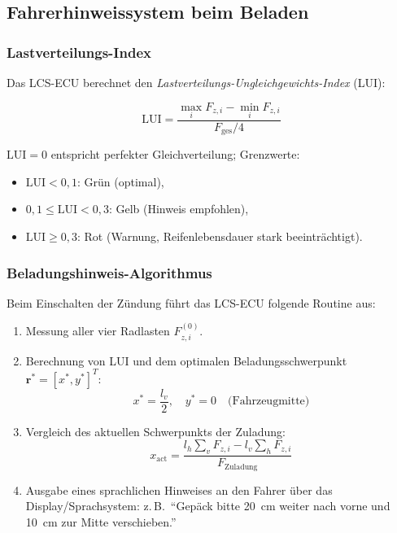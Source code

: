 ﻿\documentclass[12pt,a4paper]{article}
\theoremstyle{definition}
\theoremstyle{remark}
\begin{document}
\subsection{Fahrerhinweissystem beim Beladen}

\subsubsection{Lastverteilungs-Index}

Das LCS-ECU berechnet den \emph{Lastverteilungs-Ungleichgewichts-Index} (LUI):

\begin{equation}
  \mathrm{LUI} = \frac{\max_i F_{z,i} - \min_i F_{z,i}}{F_{\mathrm{ges}} / 4}
  \label{eq:lui}
\end{equation}

$\mathrm{LUI} = 0$ entspricht perfekter Gleichverteilung; Grenzwerte:
\begin{itemize}[nosep]
  \item $\mathrm{LUI} < 0{,}1$: Grün (optimal),
  \item $0{,}1 \leq \mathrm{LUI} < 0{,}3$: Gelb (Hinweis empfohlen),
  \item $\mathrm{LUI} \geq 0{,}3$: Rot (Warnung, Reifenlebensdauer stark beeinträchtigt).
\end{itemize}

\subsubsection{Beladungshinweis-Algorithmus}

Beim Einschalten der Zündung führt das LCS-ECU folgende Routine aus:

\begin{enumerate}
  \item Messung aller vier Radlasten $F_{z,i}^{(0)}$.
  \item Berechnung von LUI und dem optimalen Beladungsschwerpunkt
        $\mathbf{r}^* = [x^*, y^*]^T$:
        \begin{equation}
          x^* = \frac{l_v}{2}, \quad
          y^* = 0
          \quad \text{(Fahrzeugmitte)}
          \label{eq:optimal_load_center}
        \end{equation}
  \item Vergleich des aktuellen Schwerpunkts der Zuladung:
        \begin{equation}
          x_{\mathrm{act}} = \frac{l_h \sum_v F_{z,i} - l_v \sum_h F_{z,i}}{F_{\mathrm{Zuladung}}}
          \label{eq:actual_cog}
        \end{equation}
  \item Ausgabe eines sprachlichen Hinweises an den Fahrer über das Display/Sprachsystem:
        z.\,B.\ ``Gepäck bitte \SI{20}{\centi\metre} weiter nach vorne und
        \SI{10}{\centi\metre} zur Mitte verschieben.''
\end{enumerate}
\end{document}
